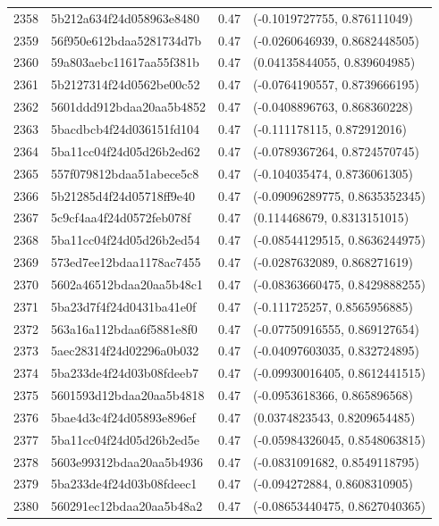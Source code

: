 \begin{table}[ht]
\begin{tabular}{rlrl}
  2358 & 5b212a634f24d058963e8480 & 0.47 & (-0.1019727755, 0.876111049) \\ 
  2359 & 56f950e612bdaa5281734d7b & 0.47 & (-0.0260646939, 0.8682448505) \\ 
  2360 & 59a803aebc11617aa55f381b & 0.47 & (0.04135844055, 0.839604985) \\ 
  2361 & 5b2127314f24d0562be00c52 & 0.47 & (-0.0764190557, 0.8739666195) \\ 
  2362 & 5601ddd912bdaa20aa5b4852 & 0.47 & (-0.0408896763, 0.868360228) \\ 
  2363 & 5bacdbcb4f24d036151fd104 & 0.47 & (-0.111178115, 0.872912016) \\ 
  2364 & 5ba11cc04f24d05d26b2ed62 & 0.47 & (-0.0789367264, 0.8724570745) \\ 
  2365 & 557f079812bdaa51abece5c8 & 0.47 & (-0.104035474, 0.8736061305) \\ 
  2366 & 5b21285d4f24d05718ff9e40 & 0.47 & (-0.09096289775, 0.8635352345) \\ 
  2367 & 5c9cf4aa4f24d0572feb078f & 0.47 & (0.114468679, 0.8313151015) \\ 
  2368 & 5ba11cc04f24d05d26b2ed54 & 0.47 & (-0.08544129515, 0.8636244975) \\ 
  2369 & 573ed7ee12bdaa1178ac7455 & 0.47 & (-0.0287632089, 0.868271619) \\ 
  2370 & 5602a46512bdaa20aa5b48c1 & 0.47 & (-0.08363660475, 0.8429888255) \\ 
  2371 & 5ba23d7f4f24d0431ba41e0f & 0.47 & (-0.111725257, 0.8565956885) \\ 
  2372 & 563a16a112bdaa6f5881e8f0 & 0.47 & (-0.07750916555, 0.869127654) \\ 
  2373 & 5aec28314f24d02296a0b032 & 0.47 & (-0.04097603035, 0.832724895) \\ 
  2374 & 5ba233de4f24d03b08fdeeb7 & 0.47 & (-0.09930016405, 0.8612441515) \\ 
  2375 & 5601593d12bdaa20aa5b4818 & 0.47 & (-0.0953618366, 0.865896568) \\ 
  2376 & 5bae4d3c4f24d05893e896ef & 0.47 & (0.0374823543, 0.8209654485) \\ 
  2377 & 5ba11cc04f24d05d26b2ed5e & 0.47 & (-0.05984326045, 0.8548063815) \\ 
  2378 & 5603e99312bdaa20aa5b4936 & 0.47 & (-0.0831091682, 0.8549118795) \\ 
  2379 & 5ba233de4f24d03b08fdeec1 & 0.47 & (-0.094272884, 0.8608310905) \\ 
  2380 & 560291ec12bdaa20aa5b48a2 & 0.47 & (-0.08653440475, 0.8627040365) \\ 

\end{tabular}
\end{table}
